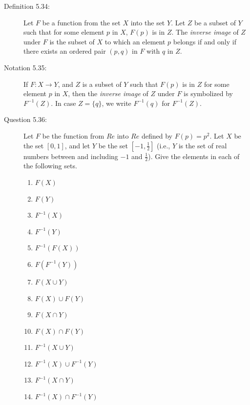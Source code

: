 \documentclass{book}
\begin{document}
\begin{description}
\item[Definition 5.34:] Let $F$ be a function from the set $X$ into the set $Y$. Let $Z$ be a subset of $Y$ such that for some element $p$ in $X$, $F(p)$ is in $Z$. The \emph{inverse image} of $Z$ under $F$ is the subset of $X$ to which an element $p$ belongs if and only if there exists an ordered pair $(p,q)$ in $F$ with $q$ in $Z$.

\item[Notation 5.35:] If $F: X \rightarrow Y$, and $Z$ is a subset of $Y$ such that $F(p)$ is in $Z$ for some element $p$ in $X$, then the \emph{inverse image} of $Z$ under $F$ is symbolized by $F^{-1}(Z)$. In case $Z = \{ q \}$, we write $F^{-1}(q)$ for $F^{-1}(Z)$.

\item[Question 5.36:] Let $F$ be the function from $Re$ into $Re$ defined by $F(p) = p^{2}$. Let $X$ be the set $[0,1]$, and let $Y$ be the set $[-1,\frac{1}{2}]$ (i.e., $Y$ is the set of real numbers between and including $-1$ and $\frac{1}{2}$). Give the elements in each of the following sets.
\begin{enumerate}[\hspace{1cm}(a)]
  \item $F(X)$
  \item $F(Y)$
  \item $F^{-1}(X)$
  \item $F^{-1}(Y)$
  \item $F^{-1}(F(X))$
  \item $F(F^{-1}(Y))$
  \item $F(X \cup Y)$
  \item $F(X) \cup F(Y)$
  \item $F(X \cap Y)$
  \item $F(X) \cap F(Y)$
  \item $F^{-1}(X \cup Y)$
  \item $F^{-1}(X) \cup F^{-1}(Y)$
  \item $F^{-1}(X \cap Y)$
  \item $F^{-1}(X) \cap F^{-1}(Y)$
\end{enumerate}


\end{description}
\end{document}
